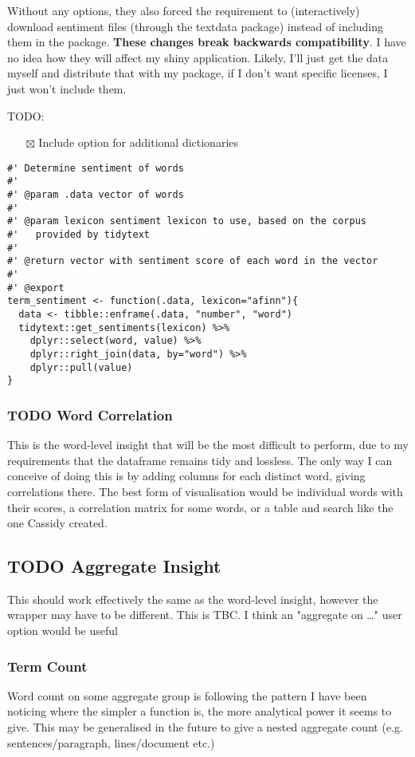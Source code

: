 \documentclass[a4paper, 11pt]{article}
\begin{document}
Without any options, they also forced the requirement to
(interactively) download sentiment files (through the textdata
package) instead of including them in the package. \textbf{These changes
break backwards compatibility}. I have no idea how they will affect my
shiny application. Likely, I'll just get the data myself and
distribute that with my package, if I don't want specific licenses, I
just won't include them.

TODO:
\begin{itemize}
\item[{$\boxtimes$}] Include option for additional dictionaries
\end{itemize}
\begin{verbatim}
#' Determine sentiment of words
#'
#' @param .data vector of words
#'
#' @param lexicon sentiment lexicon to use, based on the corpus
#'   provided by tidytext
#' 
#' @return vector with sentiment score of each word in the vector
#'
#' @export
term_sentiment <- function(.data, lexicon="afinn"){
  data <- tibble::enframe(.data, "number", "word")
  tidytext::get_sentiments(lexicon) %>%
    dplyr::select(word, value) %>%
    dplyr::right_join(data, by="word") %>%
    dplyr::pull(value)
}
\end{verbatim}
\subsubsection{{\bfseries\sffamily TODO} Word Correlation}
\label{sec:org139dcb7}
This is the word-level insight that will be the most difficult to
perform, due to my requirements that the dataframe remains tidy and
lossless. The only way I can conceive of doing this is by adding
columns for each distinct word, giving correlations there. The best
form of visualisation would be individual words with their scores, a
correlation matrix for some words, or a table and search like the one
Cassidy created.
\subsection{{\bfseries\sffamily TODO} Aggregate Insight}
\label{sec:org2809dfb}
This should work effectively the same as the word-level insight,
however the wrapper may have to be different. This is TBC. I think an
"aggregate on \ldots{}" user option would be useful
\subsubsection{Term Count}
\label{sec:org4b840f5}
Word count on some aggregate group is following the pattern I have
been noticing where the simpler a function is, the more analytical
power it seems to give. This may be generalised in the future to give
a nested aggregate count (e.g. sentences/paragraph, lines/document
etc.)
\end{document}
